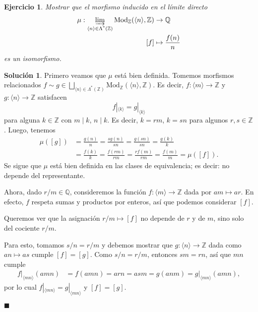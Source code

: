 \documentclass[12pt,letterpaper,titlepage]{article}
\newcommand{\xqed}[1]{%
  \leavevmode\unskip\penalty9999 \hbox{}\nobreak\hfill
  \quad\hbox{\ensuremath{#1}}}
\newtheorem{exe}{Ejercicio}
\theoremstyle{definition}
\newtheorem*{soltemp}{Solución}
\newenvironment{sol}[1]{%
    \begin{soltemp}#1}{%
    \xqed{\blacksquare}\end{soltemp}%
}
\newcommand\Z{\mathbb Z}
\newcommand\Q{\mathbb Q}
\newcommand\nti[1]{\Lambda^{\text{*}}({#1})}
\newcommand\<{\langle}
\renewcommand\>{\rangle}
\newcommand{\Mod}{\mathrm{Mod}}
\begin{document}
\begin{exe}%
  Mostrar que el morfismo inducido en el límite directo
  \begin{align*}
      \mu : \varinjlim_{\<n\>\in\nti\Z}\Mod_\Z(\<n\>,\Z)
        &\to \Q \\
      [f] &\mapsto \frac{f(n)}{n}
  \end{align*}
  es un isomorfismo.
\end{exe}
\begin{sol}
    Primero veamos que $\mu$ está bien definida.
    Tomemos morfismos relacionados
    $f\sim g\in\bigsqcup_{\<n\>\in\nti\Z}\Mod_\Z(\<n\>,\Z)$.
    Es decir, $f:\<m\>\to\Z$ y $g:\<n\>\to\Z$ satisfacen
    \[
        f|_{\<k\>} = g|_{\<k\>}
    \]
    para alguna $k\in\Z$ con $m\mid k$, $n\mid k$.
    Es decir, $k=rm$, $k=sn$ para algunos $r,s\in\Z$.
    Luego, tenemos
    \begin{align*}
        \mu([g])
        &= \frac {g(n)} n
        = \frac {sg(n)}{sn} 
        = \frac {g(sn)}{sn} 
        = \frac {g(k)}{k} \\
        &= \frac {f(k)}{k} 
        = \frac {f(rm)}{rm} 
        = \frac {rf(m)}{rm} 
        = \frac {f(m)}{m} 
        = \mu([f]).
    \end{align*}
    Se sigue que $\mu$ está bien definida
    en las clases de equivalencia;
    es decir: no depende del representante.

    Ahora, dado $r/m\in\Q$, consideremos la función
    $f:\<m\>\to\Z$ dada por $am\mapsto ar$.
    En efecto, $f$ respeta sumas y productos por enteros,
    así que podemos considerar $[f]$.
    
    Queremos ver que la asignación $r/m\mapsto [f]$ no
    depende de $r$ y de $m$, sino solo del cociente $r/m$.
    
    Para esto, tomamos $s/n=r/m$ y
    debemos mostrar que $g:\<n\>\to\Z$
    dada como $an\mapsto as$ cumple $[f]=[g]$.
    Como $s/n=r/m$, entonces $sm=rn$, así que $mn$ cumple
    \begin{align*}
        f|_{\<mn\>}(amn)
        &= f(amn)
        = arn
        = asm
        = g(anm)
        = g|_{\<mn\>}(amn),
    \end{align*}
    por lo cual $f|_{\<mn\>}=g|_{\<mn\>}$ y $[f]=[g]$.
    

\end{sol}
\end{document}
